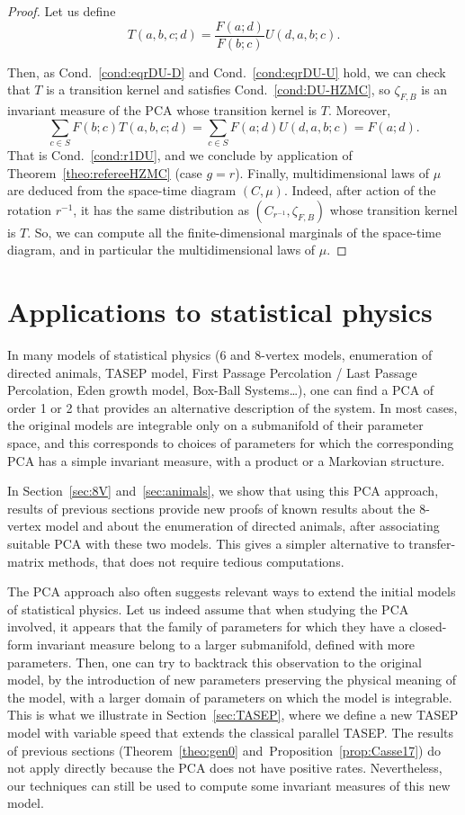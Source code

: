 \documentclass[AHL,Unicode,longabstracts]{cedram}
\newcounter{a}
\newcommand{\Cond}{Cond.}
\begin{document}
\begin{proof}
Let us define
\[
T(a,b,c;d) = \frac{F(a;d)}{F(b;c)}U(d,a,b;c).
\]

\goodbreak
Then, as \Cond~\ref{cond:eqrDU-D} and \Cond~\ref{cond:eqrDU-U} hold, we can check that $T$ is a transition kernel and satisfies \Cond~\ref{cond:DU-HZMC}, so $\zeta_{F,B}$ is an invariant measure of the PCA whose transition kernel is $T$. Moreover,
\[
\sum_{c\in S} F(b;c) {T}(a,b,c;d) = \sum_{c\in S} F(a;d) U(d,a,b;c) = F(a;d).
\]
That is \Cond~\ref{cond:r1DU}, and we conclude by application of Theorem~\ref{theo:refereeHZMC} (case $g=r$). Finally, multidimensional laws of $\mu$ are deduced from the space-time diagram $(C,\mu)$. Indeed, after action of the rotation $r^{-1}$, it has the same distribution as $(C_{r^{-1}},\zeta_{F,B})$ whose transition kernel is $T$. So, we can compute all the finite-dimensional marginals of the space-time diagram, and in particular the multidimensional laws of $\mu$.
\end{proof}

\section{Applications to statistical physics}\label{sec:sp}

In many models of statistical physics (6 and 8-vertex models, enumeration of directed animals, TASEP model, First Passage Percolation / Last Passage Percolation, Eden growth model, Box-Ball Systems\dots), one can find a PCA of order 1 or 2 that provides an alternative description of the system. In most cases, the original models are integrable only on a submanifold of their parameter space, and this corresponds to choices of parameters for which the corresponding PCA has a simple invariant measure, with a product or a Markovian structure.

In Section~\ref{sec:8V} and~\ref{sec:animals}, we show that using this PCA approach, results of previous sections provide new proofs of known results about the 8-vertex model and about the enumeration of directed animals, after associating suitable PCA with these two models. This gives a simpler alternative to transfer-matrix methods, that does not require tedious computations.

The PCA approach also often suggests relevant ways to extend the initial models of statistical physics. Let us indeed assume that when studying the PCA involved, it appears that the family of parameters for which they have a closed-form invariant measure belong to a larger submanifold, defined with more parameters. Then, one can try to backtrack this observation to the original model, by the introduction of new parameters preserving the physical meaning of the model, with a larger domain of parameters on which the model is integrable. This is what we illustrate in Section~\ref{sec:TASEP}, where we define a new TASEP model with variable speed that extends the classical parallel TASEP. The results of previous sections (Theorem~\ref{theo:gen0} and~Proposition~\ref{prop:Casse17}) do not apply directly because the PCA does not have positive rates. Nevertheless, our techniques can still be used to compute some invariant measures of this new model.
\end{document}

